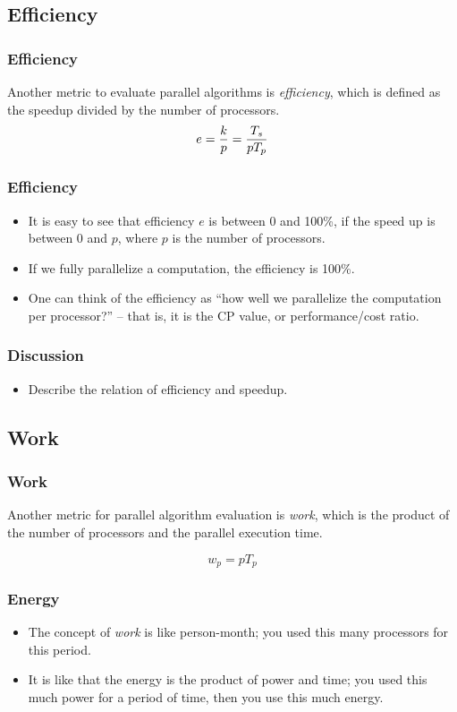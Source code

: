 \documentclass{beamer}
\begin{document}
\begin{CJK}{UTF8}{bsmi}
\subsection{Efficiency}

\begin{frame}
\frametitle{Efficiency} Another metric to evaluate parallel algorithms
is {\em efficiency}, which is defined as the speedup divided by the
number of processors.
\begin{equation}
e = {k \over p} =  {T_s \over {p T_p}}
\end{equation}
\end{frame}

\begin{frame}
\frametitle{Efficiency}
\begin{itemize}
\item It is easy to see that efficiency $e$ is between 0 and 100\%, if
  the speed up is between 0 and $p$, where $p$ is the number of
  processors.
\item If we fully parallelize a computation, the efficiency is 100\%.
\item One can think of the efficiency as ``how well we parallelize the
  computation per processor?'' -- that is, it is the CP value, or
  performance/cost ratio.
\end{itemize}
\end{frame}

\begin{frame}
\frametitle{Discussion}
\begin{itemize}
\item Describe the relation of efficiency and speedup.
\end{itemize}
\end{frame}

\subsection{Work}

\begin{frame}
\frametitle{Work} 

Another metric for parallel algorithm evaluation is {\em work}, which is the product of the number of processors and the parallel execution time.

\begin{equation}
w_p = p T_p
\end{equation}
\end{frame}

\begin{frame}
\frametitle{Energy}
\begin{itemize}
\item The concept of {\em work} is like person-month; you used this many processors for this period.
\item It is like that the energy is the product of power and time; you used this much power for a period of time, then you use this much energy.
\end{itemize}
\end{frame}


\end{CJK}
\end{document}
